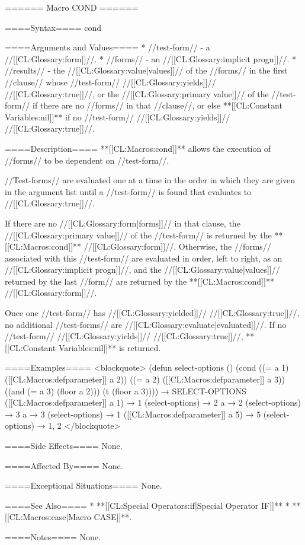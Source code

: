 ====== Macro COND ======

====Syntax====
\DefmacWithValues cond {} {}


====Arguments and Values====
  * //test-form// - a //[[CL:Glossary:form]]//.
  * //forms// - an //[[CL:Glossary:implicit progn]]//.
  * //results// - the //[[CL:Glossary:value|values]]// of the //forms// in the first //clause// whose //test-form// //[[CL:Glossary:yields]]// //[[CL:Glossary:true]]//, or the //[[CL:Glossary:primary value]]// of the //test-form// if there are no //forms// in that //clause//, or else **[[CL:Constant Variables:nil]]** if no //test-form// //[[CL:Glossary:yields]]// //[[CL:Glossary:true]]//.

====Description====
**[[CL:Macros:cond]]** allows the execution of //forms// to be dependent on //test-form//.

//Test-forms// are evaluated one at a time in the order in which they are given in the argument list until a //test-form// is found that evaluates to //[[CL:Glossary:true]]//.

If there are no //[[CL:Glossary:form|forms]]// in that clause, the //[[CL:Glossary:primary value]]// of the //test-form// is returned by the **[[CL:Macros:cond]]** //[[CL:Glossary:form]]//. Otherwise, the //forms// associated with this //test-form// are evaluated in order, left to right, as an //[[CL:Glossary:implicit progn]]//, and the //[[CL:Glossary:value|values]]// returned by the last //form// are returned by the **[[CL:Macros:cond]]** //[[CL:Glossary:form]]//.

Once one //test-form// has //[[CL:Glossary:yielded]]// //[[CL:Glossary:true]]//, no additional //test-forms// are //[[CL:Glossary:evaluate|evaluated]]//. If no //test-form// //[[CL:Glossary:yields]]// //[[CL:Glossary:true]]//, **[[CL:Constant Variables:nil]]** is returned.

====Examples====
<blockquote> (defun select-options () (cond ((= a 1) ([[CL:Macros:defparameter]] a 2)) ((= a 2) ([[CL:Macros:defparameter]] a 3)) ((and (= a 3) (floor a 2))) (t (floor a 3)))) → SELECT-OPTIONS ([[CL:Macros:defparameter]] a 1) → 1 (select-options) → 2 a → 2 (select-options) → 3 a → 3 (select-options) → 1 ([[CL:Macros:defparameter]] a 5) → 5 (select-options) → 1, 2 </blockquote>

====Side Effects====
None.

====Affected By====
None.

====Exceptional Situations====
None.

====See Also====
  * **[[CL:Special Operators:if|Special Operator IF]]**
  * **[[CL:Macros:case|Macro CASE]]**.

====Notes====
None.



